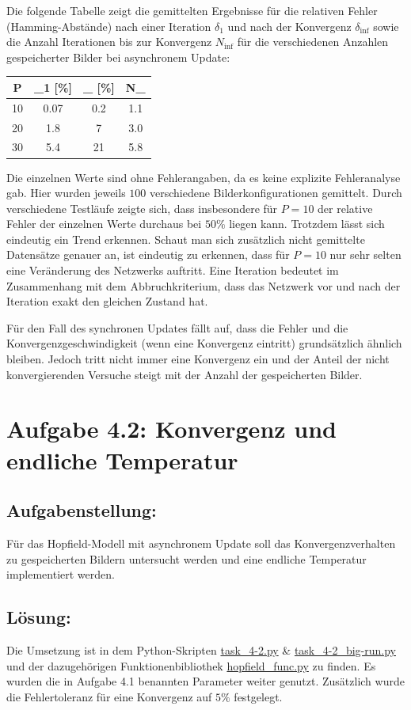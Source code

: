 \documentclass[12pt,a4paper]{article}
\begin{document}
Die folgende Tabelle zeigt die gemittelten Ergebnisse für die relativen Fehler (Hamming-Abstände) nach einer Iteration $\delta_1$ und nach der Konvergenz $\delta_{\inf}$ sowie die Anzahl Iterationen bis zur Konvergenz $N_{\inf}$ für die verschiedenen Anzahlen gespeicherter Bilder bei asynchronem Update:
\begin{center}
\begin{tabular}{C|C|C|C}
	P & \delta_1 [\%] & \delta_{\inf} [\%] & N_{\inf} \\  & 0.07 & 0.2 & 1.1 \\
	20 & 1.8 & 7 & 3.0 \\
	30 & 5.4 & 21 & 5.8
\end{tabular}
\end{center}
Die einzelnen Werte sind ohne Fehlerangaben, da es keine explizite Fehleranalyse gab. Hier wurden jeweils $100$ verschiedene Bilderkonfigurationen gemittelt. Durch verschiedene Testläufe zeigte sich, dass insbesondere für $P=10$ der relative Fehler der einzelnen Werte durchaus bei $50\%$ liegen kann. Trotzdem lässt sich eindeutig ein Trend erkennen. Schaut man sich zusätzlich nicht gemittelte Datensätze genauer an, ist eindeutig zu erkennen, dass für $P=10$ nur sehr selten eine Veränderung des Netzwerks auftritt. Eine Iteration bedeutet im Zusammenhang mit dem Abbruchkriterium, dass das Netzwerk vor und nach der Iteration exakt den gleichen Zustand hat.

Für den Fall des synchronen Updates fällt auf, dass die Fehler und die Konvergenzgeschwindigkeit (wenn eine Konvergenz eintritt) grundsätzlich ähnlich bleiben. Jedoch tritt nicht immer eine Konvergenz ein und der Anteil der nicht konvergierenden Versuche steigt mit der Anzahl der gespeicherten Bilder.

\section*{Aufgabe 4.2: Konvergenz und endliche Temperatur}
\subsection*{Aufgabenstellung:}
Für das Hopfield-Modell mit asynchronem Update soll das Konvergenzverhalten zu gespeicherten Bildern untersucht werden und eine endliche Temperatur implementiert werden.
\subsection*{Lösung:}
Die Umsetzung ist in dem Python-Skripten \url{task_4-2.py} \& \url{task_4-2_big-run.py} und der dazugehörigen Funktionenbibliothek \url{hopfield_func.py} zu finden. Es wurden die in Aufgabe 4.1 benannten Parameter weiter genutzt. Zusätzlich wurde die Fehlertoleranz für eine Konvergenz auf $5\%$ festgelegt.
\end{document}
